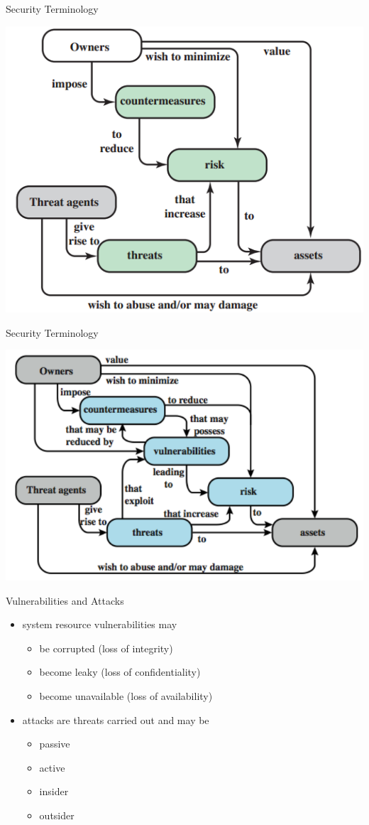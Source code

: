 \documentclass{beamer}
\begin{document}
\begin{frame}{Security Terminology}
  \begin{center}
    \includegraphics[width=0.7\linewidth]{terminology}
  \end{center}
\end{frame}

\begin{frame}{Security Terminology}
  \begin{center}
    \includegraphics[width=0.7\linewidth]{terminology2}
  \end{center}
\end{frame}

\begin{frame}{Vulnerabilities and Attacks }
  \begin{itemize}
    \item system resource vulnerabilities may 
      
      \begin{itemize}
        \item be corrupted (loss of integrity) 
        \item become leaky (loss of confidentiality) 
        \item become unavailable (loss of availability) 
      \end{itemize}
    \item attacks are threats carried out and may be 
      \begin{itemize}
        \item passive
        \item active
        \item insider
        \item outsider
      \end{itemize}
  \end{itemize}
\end{frame}
\end{document}
